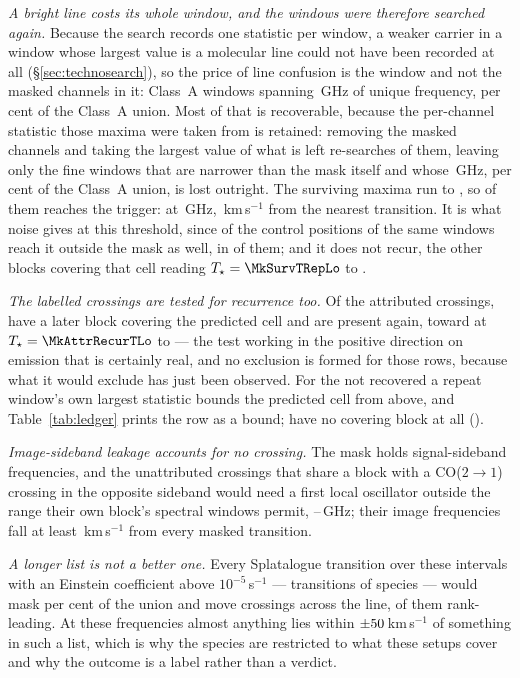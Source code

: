 \emph{A bright line costs its whole window, and the windows were therefore
searched again.} Because the search records one statistic per window, a
weaker carrier in a window whose largest value is a molecular line could not
have been recorded at all (\S\ref{sec:technosearch}), so the price of line
confusion is the window and not the masked channels in it: \MkNCoinc{}
Class~A windows spanning \MkLineDomGHz\,GHz of unique frequency,
\MkLineDomPct{} per cent of the Class~A union. Most of that is recoverable,
because the per-channel statistic those maxima were taken from is retained:
removing the masked channels and taking the largest value of what is left
re-searches \MkNResearch{} of them, leaving only the \MkNWholly{} fine
windows that are narrower than the mask itself and whose \MkWhollyGHz\,GHz,
\MkWhollyPct{} per cent of the Class~A union, is lost outright. The surviving
maxima run \MkResidLo{} to \MkResidHi, so \MkNResidTrigWord{} of them
reaches the trigger: \MkSurvStar{} at \MkSurvFreq\,GHz,
\MkSurvDv\,km\,s$^{-1}$ from the nearest transition. It is what noise gives
at this threshold, since \MkNCtrlTrig{} of the \MkNCtrlPos{} control
positions of the same windows
reach it outside the mask as well, in \MkNWinCtrlTrig{} of them; and it does
not recur, the \MkSurvNRep{} other blocks covering that cell reading
$T_\star=\MkSurvTRepLo$ to \MkSurvTRepHi.

\emph{The labelled crossings are tested for recurrence too.} Of the
\MkAttr{} attributed crossings, \MkAttrTested{} have a later block covering
the predicted cell and \MkAttrRecur{} are present again, toward
\MkAttrRecurStars{} at $T_\star=\MkAttrRecurTLo$ to \MkAttrRecurTHi{} --- the
test working in the positive direction on emission that is certainly real,
and no exclusion is formed for those rows, because what it would exclude has
just been observed. For the \MkAttrExcl{} not recovered a repeat window's own
largest statistic bounds the predicted cell from above, and
Table~\ref{tab:ledger} prints the row as a bound; \MkAttrUntest{} have no
covering block at all (\MkAttrUntestNames).

\emph{Image-sideband leakage accounts for no crossing.} The mask holds
signal-sideband frequencies, and the \MkImgN{} unattributed crossings that
share a block with a CO($2\to1$) crossing in the opposite sideband would need
a first local oscillator outside the range their own block's spectral windows
permit, \MkImgLOLo--\MkImgLOHi\,GHz; their image frequencies fall at least
\MkImgDvMin\,km\,s$^{-1}$ from every masked transition.

\emph{A longer list is not a better one.} Every Splatalogue transition over
these intervals with an Einstein coefficient above $10^{-5}$\,s$^{-1}$ ---
\MaskDbTrans{} transitions of \MaskDbCarriers{} species --- would mask
\MaskDbPctUnion{} per cent of the union and move \FrFullNFlip{} crossings
across the line, \FrFullNFlipRankWord{} of them rank-leading. At these
frequencies almost anything lies within $\pm50$\,km\,s$^{-1}$ of
something in such a list, which is why the species are restricted to what
these setups cover and why the outcome is a label rather than a verdict.
